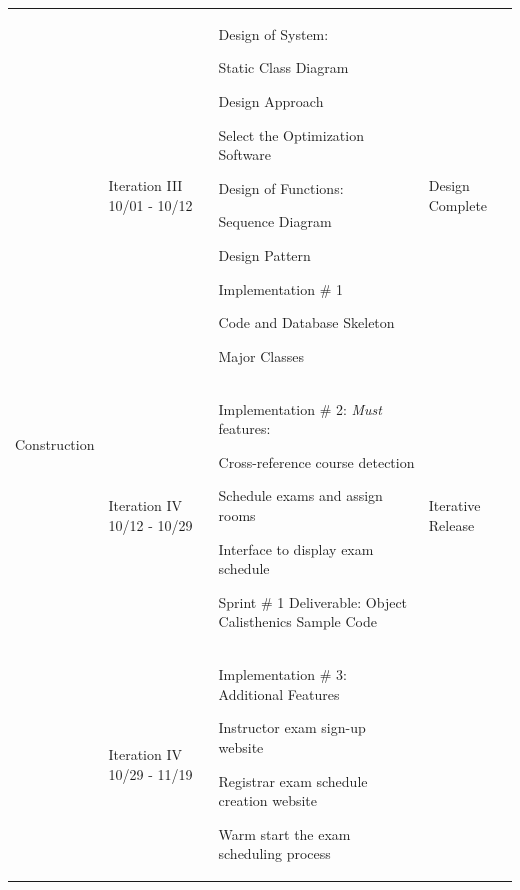 \documentclass[11pt]{article}
\newenvironment{packed_itemize}{
\begin{itemize}
  \setlength{\itemsep}{1pt}
  \setlength{\parskip}{0pt}
  \setlength{\parsep}{0pt}
}{\end{itemize}}
\begin{document}
\begin{tabular}{|m{0.9in}|m{0.9in}|m{4in}|m{.8in}|}
\multirow{10}{*}{Construction }
 &
 Iteration III 10/01 - 10/12 & \vspace{0.1in}
 Design of System:
	\begin{packed_itemize}
		\vspace{-0.15in}
		\item Static Class Diagram
		\item Design Approach
		\item Select the Optimization Software
	\end{packed_itemize}

 Design of Functions:
	\begin{packed_itemize}
		\vspace{-0.15in}
		\item Sequence Diagram
		\item  Design Pattern
	\end{packed_itemize}

 Implementation \# 1
	\begin{packed_itemize}
	\vspace{-0.15in}
		\item Code and Database Skeleton
		\item Major Classes
	\vspace{-0.15in}
	\end{packed_itemize}
 & Design Complete \\  \cline{2-4}
&
 Iteration IV 10/12 - 10/29 & \vspace{0.1in}
 Implementation \# 2:
\emph{Must} features:
	\begin{packed_itemize}
	\vspace{-0.15in}
		\item Cross-reference course detection
		\item Schedule exams and assign rooms
		\item Interface to display exam schedule
	\end{packed_itemize}

{\raggedright
Sprint \# 1 Deliverable:
Object Calisthenics Sample Code }
 & Iterative Release \\  \cline{2-4}
 &
 Iteration IV 10/29 - 11/19 & \vspace{0.1in}
 Implementation \# 3: Additional Features
	\begin{packed_itemize}
	\vspace{-0.15in}
		\item Instructor exam sign-up website
		\item Registrar exam schedule creation website
		\item Warm start the exam scheduling process
	\end{packed_itemize}


\end{tabular}
\end{document}
